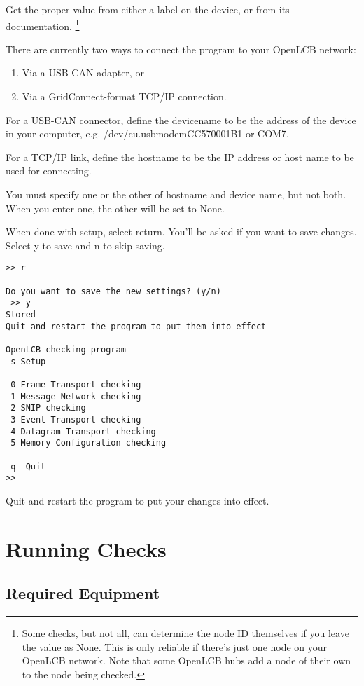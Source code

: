 \documentclass[11pt]{article}
\begin{document}
Get the proper value from either a label on the device, or from its documentation.
\footnote{Some checks, but not all, can determine the node ID themselves if you leave
    the value as None. This is only reliable if there's just one node on your OpenLCB
    network.  Note that some OpenLCB hubs add a node of their own to the node
    being checked.}
    
There are currently two ways to connect the program to your OpenLCB network:
\begin{enumerate}
\item Via a USB-CAN adapter, or
\item Via a GridConnect-format TCP/IP connection.
\end{enumerate}

For a USB-CAN connector, define the devicename to be the address of the device in your computer, 
e.g. /dev/cu.usbmodemCC570001B1 or COM7.

For a TCP/IP link, define the hostname to be the IP address or host name to be used 
for connecting.

You must specify one or the other of hostname and device name, but not both.
When you enter one, the other will be set to None.

When done with setup, select return.  You'll be asked if you want to save changes.  
Select y to save and n to skip saving.

\begin{verbatim}
>> r

Do you want to save the new settings? (y/n)
 >> y
Stored
Quit and restart the program to put them into effect

OpenLCB checking program
 s Setup

 0 Frame Transport checking
 1 Message Network checking
 2 SNIP checking
 3 Event Transport checking
 4 Datagram Transport checking
 5 Memory Configuration checking
  
 q  Quit
>> 
\end{verbatim}

Quit and restart the program to put your changes into effect.

\section{Running Checks}

\subsection{Required Equipment}
\end{document}
